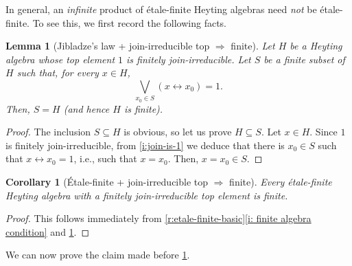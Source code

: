 \documentclass[12pt]{amsart}
\theoremstyle{plain}
\newtheorem{lemma}[theorem]{Lemma}
\newtheorem{corollary}[theorem]{Corollary}
\theoremstyle{definition}
\begin{document}
In general, an \emph{infinite} product of étale-finite Heyting algebras need \emph{not} be étale-finite.
To see this, we first record the following facts.

\begin{lemma}[Jibladze's law + join-irreducible top $\Rightarrow$ finite]\label{l:join-irreducible}
    Let $H$ be a Heyting algebra whose top element $1$ is finitely join-irreducible.
    Let $S$ be a finite subset of $H$ such that, for every $x \in H$,
    \begin{equation} \label{i:join-is-1}
        \bigvee_{x_0\in S}(x\leftrightarrow x_0)=1.
    \end{equation}
    Then, $S = H$ (and hence $H$ is finite).
\end{lemma}

\begin{proof}
    The inclusion $S \subseteq H$ is obvious, so let us prove $H \subseteq S$. 
    Let $x \in H$. Since $1$ is finitely join-irreducible, from \eqref{i:join-is-1} we deduce that there is $x_0 \in S$ such that $x \leftrightarrow x_0 = 1$, i.e., such that $x = x_0$.
    Then, $x = x_0 \in S$.
\end{proof}

\begin{corollary}[\'Etale-finite + join-irreducible top $\Rightarrow$ finite] \label{c:finitely join irreducible}
    Every étale-finite Heyting algebra with a finitely join-irreducible top element is finite.
\end{corollary}

\begin{proof}
    This follows immediately from \cref{r:etale-finite-basic}\eqref{i: finite algebra condition} and \cref{l:join-irreducible}.
\end{proof}

We can now prove the claim made before \cref{l:join-irreducible}.
\end{document}
